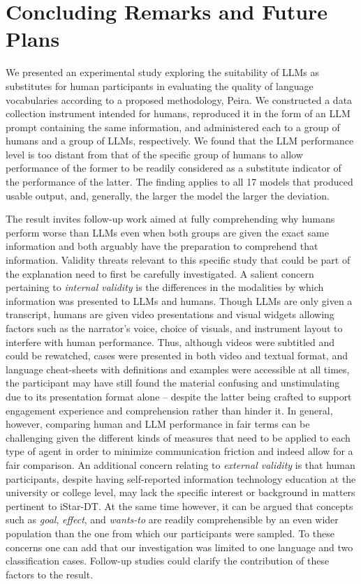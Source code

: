 \section{Concluding Remarks and Future Plans}\label{sec:conclusions}

We presented an experimental study exploring the suitability of LLMs as substitutes for human participants in evaluating the quality of language vocabularies according to a proposed methodology, Peira. We constructed a data collection instrument intended for humans, reproduced it in the form of an LLM prompt containing the same information, and administered each to a group of humans and a group of LLMs, respectively. We found that the LLM performance level is too distant from that of the specific group of humans to allow performance of the former to be readily considered as a substitute indicator of the performance of the latter. The finding applies to all 17 models that produced usable output, and, generally, the larger the model the larger the deviation.

The result invites follow-up work aimed at fully comprehending why humans perform worse than LLMs even when both groups are given the exact same information and both arguably have the preparation to comprehend that information. Validity threats relevant to this specific study that could be part of the explanation need to first be carefully investigated. A salient concern pertaining to \textit{internal validity} is the differences in the modalities by which information was presented to LLMs and humans. Though LLMs are only given a transcript, humans are given video presentations and visual widgets allowing factors such as the narrator's voice, choice of visuals, and instrument layout to interfere with human performance. Thus, although videos were subtitled and could be rewatched, cases were presented in both video and textual format, and language cheat-sheets with definitions and examples were accessible at all times, the participant may have still found the material confusing and unstimulating due to its presentation format alone -- despite the latter being crafted to support engagement experience and comprehension rather than hinder it. In general, however, comparing human and LLM performance in fair terms can be challenging given the different kinds of measures that need to be applied to each type of agent in order to minimize communication friction and indeed allow for a fair comparison. An additional concern relating to \textit{external validity} is that human participants, despite having self-reported information technology education at the university or college level, may lack the specific interest or background in matters pertinent to iStar-DT. At the same time however, it can be argued that concepts such as \textit{goal}, \textit{effect}, and \textit{wants-to} are readily comprehensible by an even wider population than the one from which our participants were sampled. To these concerns one can add that our investigation was limited to one language and two classification cases. Follow-up studies could clarify the contribution of these factors to the result.


